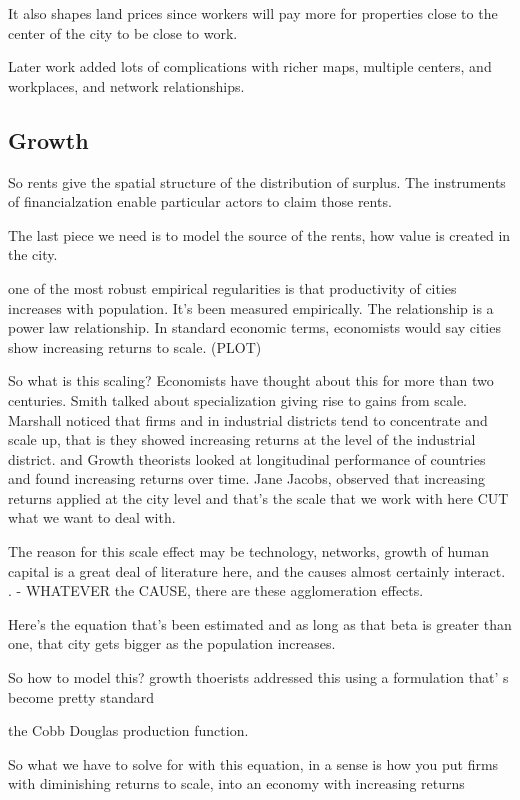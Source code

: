 \documentclass[]{article}
\begin{document}
It also shapes land prices since workers will pay more for properties close to the center of the city to be close to work.

Later work added lots of complications with richer maps,  multiple centers, and workplaces, and network relationships. 



\subsection{Growth}

So rents give the spatial structure of the distribution of surplus.
The instruments of financialzation enable particular actors to claim those rents.

The last piece we need is to model the source of the rents, 
how value is created in the city. 

one of the most robust empirical regularities is that 
productivity of cities increases with population. It's been measured empirically. The relationship is a power law relationship. In  standard economic terms, economists would say cities show increasing returns to scale. (PLOT)

So what is this  scaling?
Economists have thought about this for more than two centuries. Smith talked about specialization giving rise to gains from scale. 
Marshall noticed that firms and in industrial districts tend to concentrate and scale up, that is they showed increasing returns at the level of the industrial district. 
and Growth theorists looked at longitudinal performance of countries and found increasing returns over time.
Jane Jacobs, observed that increasing returns applied at the city level and that's the scale that we work with here CUT what we want to deal with.

The reason for this scale effect may be technology, networks, growth of human capital is a great deal of literature here, and the causes almost certainly interact. . - WHATEVER the CAUSE, there are these agglomeration effects. 

Here's the equation that's been estimated and as long as that beta is greater than one, that city gets bigger as the population increases.

So how to model this?
growth thoerists addressed this using a formulation that' s become pretty standard

the Cobb Douglas production function.  

So what we have to solve for with this equation, in a sense is how you put firms with diminishing returns to scale, into an economy with increasing returns
\end{document}

